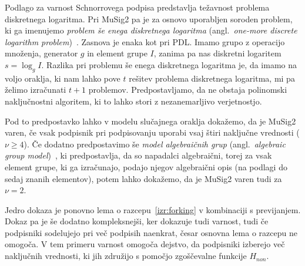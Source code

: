 Podlago za varnost Schnorrovega podpisa predstavlja težavnost problema diskretnega logaritma. Pri
MuSig2 pa je za osnovo uporabljen soroden problem, ki ga imenujemo \textit{problem še enega diskretnega logaritma}
(angl.\ \textit{one-more discrete logarithm problem})~\cite{bellare2003omdl}. Zasnova je enaka kot
pri PDL. Imamo grupo z operacijo množenja, generator $g$ in element grupe $I$, zanima pa nas diskretni
logaritem $s = \log_g I$. Razlika pri problemu še enega diskretnega logaritma je, da imamo na voljo
oraklja, ki nam lahko pove $t$ rešitev problema diskretnega logaritma, mi pa želimo izračunati $t + 1$
problemov. Predpostavljamo, da ne obstaja polinomski naključnostni algoritem, ki to lahko stori z
nezanemarljivo verjetnostjo.

Pod to predpostavko lahko v modelu slučajnega oraklja dokažemo, da je MuSig2 varen, če vsak podpisnik
pri podpisovanju uporabi vsaj štiri naključne vrednosti ($\nu \geq 4$). Če dodatno predpostavimo še
\textit{model algebraičnih grup} (angl.\ \textit{algebraic group model})~\cite{fuchsbauer2018agm},
ki predpostavlja, da so napadalci algebraični, torej za vsak element grupe, ki ga izračunajo, podajo
njegov algebraični opis (na podlagi do sedaj znanih elementov), potem lahko dokažemo, da je MuSig2
varen tudi za $\nu = 2$.

Jedro dokaza je ponovno lema o razcepu~\ref{izr:forking} v kombinaciji s previjanjem. Dokaz pa je še
dodatno kompleksnejši, ker dokazuje tudi varnost, tudi če podpisniki sodelujejo pri več podpisih naenkrat,
česar osnovna lema o razcepu ne omogoča. V tem primeru varnost omogoča dejstvo, da podpisniki izberejo
več naključnih vrednosti, ki jih združijo s pomočjo zgoščevalne funkcije $H_{non}$.

